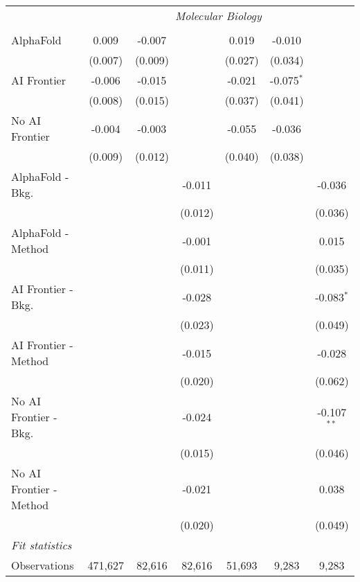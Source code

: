 \begin{tabular}{lcccccc}
 & \multicolumn{6}{c}{\textit{Molecular Biology}} \\ \\
   AlphaFold               & 0.009   & -0.007  &         & 0.019   & -0.010       &   \\   
                           & (0.007) & (0.009) &         & (0.027) & (0.034)      &   \\   
   AI Frontier             & -0.006  & -0.015  &         & -0.021  & -0.075$^{*}$ &   \\   
                           & (0.008) & (0.015) &         & (0.037) & (0.041)      &   \\   
   No AI Frontier          & -0.004  & -0.003  &         & -0.055  & -0.036       &   \\   
                           & (0.009) & (0.012) &         & (0.040) & (0.038)      &   \\   
   AlphaFold - Bkg.        &         &         & -0.011  &         &              & -0.036\\   
                           &         &         & (0.012) &         &              & (0.036)\\   
   AlphaFold - Method      &         &         & -0.001  &         &              & 0.015\\   
                           &         &         & (0.011) &         &              & (0.035)\\   
   AI Frontier - Bkg.      &         &         & -0.028  &         &              & -0.083$^{*}$\\   
                           &         &         & (0.023) &         &              & (0.049)\\   
   AI Frontier - Method    &         &         & -0.015  &         &              & -0.028\\   
                           &         &         & (0.020) &         &              & (0.062)\\   
   No AI Frontier - Bkg.   &         &         & -0.024  &         &              & -0.107$^{**}$\\   
                           &         &         & (0.015) &         &              & (0.046)\\   
   No AI Frontier - Method &         &         & -0.021  &         &              & 0.038\\   
                           &         &         & (0.020) &         &              & (0.049)\\   
   \midrule
   \emph{Fit statistics}\\
   Observations            & 471,627 & 82,616  & 82,616  & 51,693  & 9,283        & 9,283\\  
   

\end{tabular}
